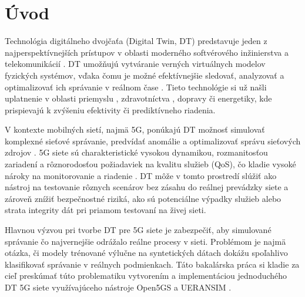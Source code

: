 \chapter{Úvod}
Technológia digitálneho dvojčaťa (Digital Twin, DT) predstavuje jeden z najperspektívnejších prístupov v oblasti moderného softvérového inžinierstva \cite{DimensionOfDTAplication} a telekomunikácií \cite{AplicationsOfDT}. DT umožňujú vytváranie verných virtuálnych modelov fyzických systémov, vďaka čomu je možné efektívnejšie sledovať, analyzovať a optimalizovať ich správanie v reálnom čase \cite{real_time}. Tieto technológie si už našli uplatnenie v oblasti priemyslu \cite{manufacturing}, zdravotníctva \cite{siemens_helthcare}, dopravy či energetiky, kde prispievajú k zvýšeniu efektivity či prediktívneho riadenia.

V kontexte mobilných sietí, najmä 5G, ponúkajú DT možnosť simulovať komplexné sieťové správanie, predvídať anomálie a optimalizovať správu sieťových zdrojov \cite{5gandbeyond}. 5G siete sú charakteristické vysokou dynamikou, rozmanitosťou zariadení a rôznorodosťou požiadaviek na kvalitu služieb (QoS), čo kladie vysoké nároky na monitorovanie a riadenie \cite{AplicationsOfDT}. DT môže v tomto prostredí slúžiť ako nástroj na testovanie rôznych scenárov bez zásahu do reálnej prevádzky siete a zároveň znížiť bezpečnostné riziká, ako sú potenciálne výpadky služieb alebo strata integrity dát pri priamom testovaní na živej sieti.

Hlavnou výzvou pri tvorbe DT pre 5G siete je zabezpečiť, aby simulované správanie čo najvernejšie odrážalo reálne procesy v sieti. Problémom je najmä otázka, či modely trénované výlučne na syntetických dátach dokážu spoľahlivo klasifikovať správanie v reálnych podmienkach. Táto bakalárska práca si kladie za cieľ preskúmať túto problematiku vytvorením a implementáciou jednoduchého DT 5G siete využívajúceho nástroje Open5GS \cite{open5gs} a UERANSIM \cite{ueransim}.